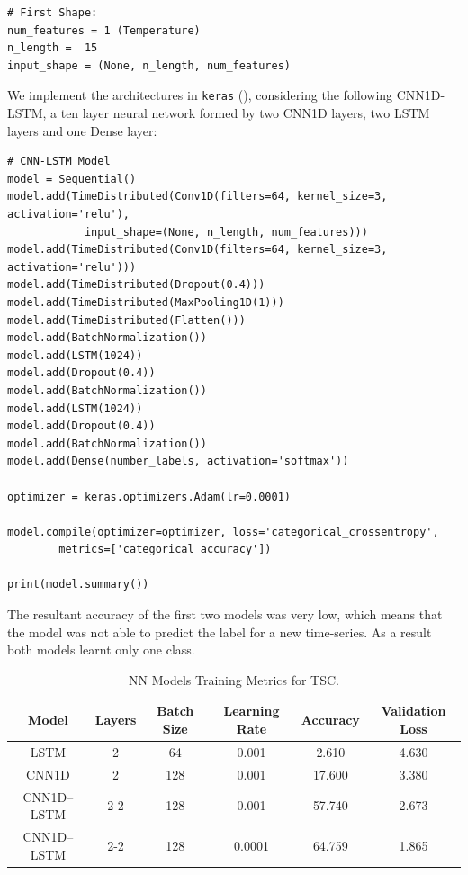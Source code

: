 \lstset{language=Python}
\lstset{frame=lines}
\lstset{basicstyle=\footnotesize}
\begin{lstlisting}
# First Shape:
num_features = 1 (Temperature)
n_length =  15
input_shape = (None, n_length, num_features)
\end{lstlisting}

We implement the architectures in \texttt{keras} (\cite{Chollet2015}),  considering the following CNN1D-LSTM, a ten layer neural network formed by two CNN1D layers, two LSTM layers and one Dense layer:

\lstset{language=Python}
\lstset{frame=lines}
\lstset{basicstyle=\footnotesize}
\begin{lstlisting}
# CNN-LSTM Model
model = Sequential()
model.add(TimeDistributed(Conv1D(filters=64, kernel_size=3, activation='relu'), 
			input_shape=(None, n_length, num_features)))
model.add(TimeDistributed(Conv1D(filters=64, kernel_size=3, activation='relu')))
model.add(TimeDistributed(Dropout(0.4)))
model.add(TimeDistributed(MaxPooling1D(1)))
model.add(TimeDistributed(Flatten()))
model.add(BatchNormalization())
model.add(LSTM(1024))
model.add(Dropout(0.4))
model.add(BatchNormalization())
model.add(LSTM(1024))
model.add(Dropout(0.4))
model.add(BatchNormalization())
model.add(Dense(number_labels, activation='softmax'))

optimizer = keras.optimizers.Adam(lr=0.0001)

model.compile(optimizer=optimizer, loss='categorical_crossentropy', 
		metrics=['categorical_accuracy'])

print(model.summary())
\end{lstlisting}

The resultant accuracy of the first two models was very low, which means that the model was not able to predict the label for a new time-series. As a result both models learnt only one class.

\begin{table}[h]
	\centering
	\tiny
	\begin{tabular}{|c|c|c|c|c|c|}
		\hline
		Model        & Layers & Batch Size & Learning Rate & Accuracy & Validation Loss \\ \hline
		LSTM         & 2      &  64        & 0.001         &  2.610   & 4.630           \\
		CNN1D        & 2      & 128        & 0.001         & 17.600   & 3.380           \\
		CNN1D--LSTM  & 2-2    & 128        & 0.001         & 57.740   & 2.673           \\ 		
		CNN1D--LSTM  & 2-2    & 128        & 0.0001		   & 64.759   & 1.865           \\ \hline		
	\end{tabular}
\caption{NN Models Training Metrics for TSC.}
\label{Table:DLModels}
\end{table}

